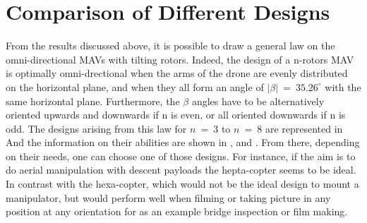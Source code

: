 \section{Comparison of Different Designs}
\label{sec:comparison}

From the results discussed above, it is possible to draw a general law on the
 omni-directional MAVs with tilting rotors. Indeed, the design of a n-rotors
MAV is optimally omni-drectional when the arms of the drone are evenly
distributed on the horizontal plane, and when they all form an angle of
$|\beta|\ =\ 35.26^{\circ}$ with the same horizontal plane. Furthermore, the
$\beta$ angles have to be alternatively oriented upwards and downwards if n
is even, or all oriented downwards if n is odd. The designs arising from this
law for $n\ = \ 3$ to $n\ = \ 8$ are represented in 
And the information on their abilities are shown in ,
 and .
From there, depending on their needs, one can choose one of those designs.
For instance, if the aim is to do aerial manipulation with descent payloads the
hepta-copter seems to be ideal. In contrast with the hexa-copter, which would not
be the ideal design to mount a manipulator, but would perform well when filming or taking
picture in any position at any orientation for as an example bridge inspection or film
making.

